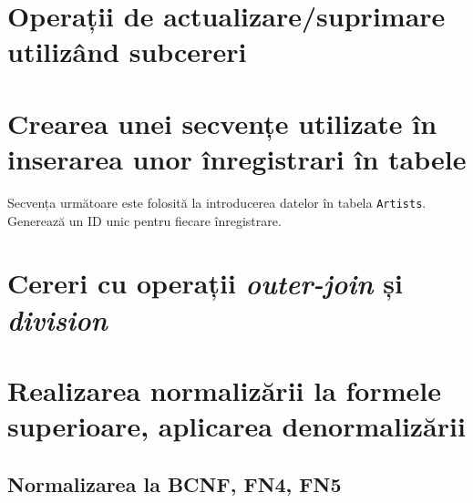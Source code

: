 \documentclass[a4paper, oneside, 12pt]{article}
\begin{document}
\section{Operații de actualizare/suprimare utilizând subcereri}

\begin{center}

\minipage{\linewidth}

\endminipage

\end{center}

\section{Crearea unei secvențe utilizate în inserarea unor înregistrari în tabele}

Secvența următoare este folosită la introducerea datelor în tabela
\texttt{Artists}. Generează un ID unic pentru fiecare înregistrare.

\begin{center}

\minipage{\linewidth}

\endminipage

\minipage{\linewidth}

\endminipage

\end{center}

\section{Cereri cu operații \emph{outer-join} și \emph{division}}

\begin{center}

\minipage{\linewidth}

\endminipage

\end{center}

\section{Realizarea normalizării la formele superioare, aplicarea denormalizării}

\subsection{Normalizarea la \textbf{BCNF}, \textbf{FN4}, \textbf{FN5}}
\end{document}
